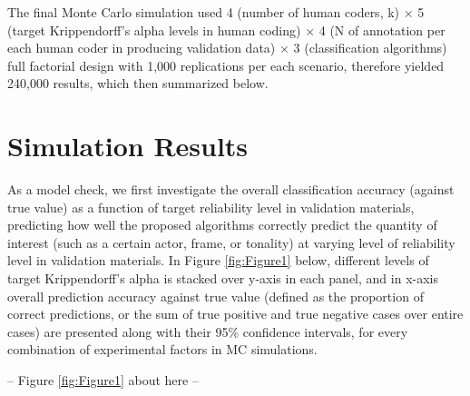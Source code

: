 \documentclass[man, 12pt, a4paper, nolmodern, noextraspace]{apa6}
\begin{document}
    The final Monte Carlo simulation used 4 (number of human coders, k) $\times$ 5 (target Krippendorff's alpha levels in human coding) $\times$ 4 (N of annotation per each human coder in producing validation data) $\times$ 3 (classification algorithms) full factorial design with 1,000 replications per each scenario, therefore yielded 240,000 results, which then summarized below.
    
\section{Simulation Results}

As a model check, we first investigate the overall classification accuracy (against true value) as a function of target reliability level in validation materials, predicting how well the proposed algorithms correctly predict the quantity of interest (such as a certain actor, frame, or tonality) at varying level of reliability level in validation materials. In Figure \ref{fig:Figure1} below, different levels of target Krippendorff's alpha is stacked over y-axis in each panel, and in x-axis overall prediction accuracy against true value (defined as the proportion of correct predictions, or the sum of true positive and true negative cases over entire cases) are presented along with their 95\% confidence intervals, for every combination of experimental factors in MC simulations.

\centerline{ -- Figure \ref{fig:Figure1} about here -- }    
    
\end{document}
